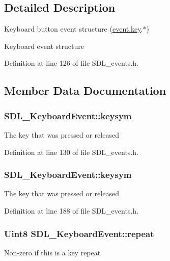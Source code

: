 \subsection{Detailed Description}
Keyboard button event structure (\hyperlink{unionSDL__Event_ab99927835cc77a9b6bb50b419b4a27df}{event.\+key}.$\ast$) 

Keyboard event structure 

Definition at line 126 of file S\+D\+L\+\_\+events.\+h.



\subsection{Member Data Documentation}
\hypertarget{structSDL__KeyboardEvent_a2a57ba820a298f2c02ad5d41fd2b1aa8}{
\subsubsection[{keysym}]{ S\+D\+L\+\_\+\+Keyboard\+Event\+::keysym}}\label{structSDL__KeyboardEvent_a2a57ba820a298f2c02ad5d41fd2b1aa8}
The key that was pressed or released 

Definition at line 130 of file S\+D\+L\+\_\+events.\+h.

\hypertarget{structSDL__KeyboardEvent_a2a57ba820a298f2c02ad5d41fd2b1aa8}{
\subsubsection[{keysym}]{ S\+D\+L\+\_\+\+Keyboard\+Event\+::keysym}}\label{structSDL__KeyboardEvent_a2a57ba820a298f2c02ad5d41fd2b1aa8}
The key that was pressed or released 

Definition at line 188 of file S\+D\+L\+\_\+events.\+h.

\hypertarget{structSDL__KeyboardEvent_a3edac3b36304812d533795c9df4ed4c1}{
\subsubsection[{repeat}]{\setlength{\rightskip}{0pt plus 5cm}Uint8 S\+D\+L\+\_\+\+Keyboard\+Event\+::repeat}}\label{structSDL__KeyboardEvent_a3edac3b36304812d533795c9df4ed4c1}
Non-\/zero if this is a key repeat 

